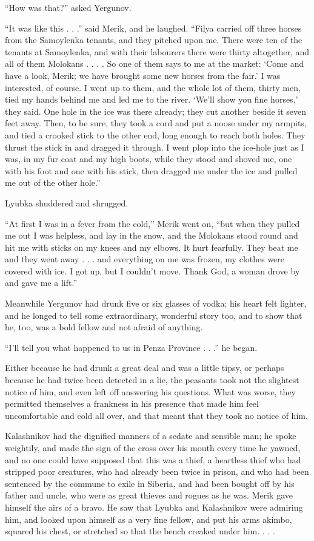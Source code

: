 “How was that?” asked Yergunov.

“It was like this . . .” said Merik, and he laughed. “Filya carried off
three horses from the Samoylenka tenants, and they pitched upon me.
There were ten of the tenants at Samoylenka, and with their labourers
there were thirty altogether, and all of them Molokans . . . . So one of
them says to me at the market: ‘Come and have a look, Merik; we have
brought some new horses from the fair.’ I was interested, of course. I
went up to them, and the whole lot of them, thirty men, tied my hands
behind me and led me to the river. ‘We’ll show you fine horses,’ they
said. One hole in the ice was there already; they cut another beside it
seven feet away. Then, to be sure, they took a cord and put a noose
under my armpits, and tied a crooked stick to the other end, long enough
to reach both holes. They thrust the stick in and dragged it through. I
went plop into the ice-hole just as I was, in my fur coat and my high
boots, while they stood and shoved me, one with his foot and one with
his stick, then dragged me under the ice and pulled me out of the other
hole.”

Lyubka shuddered and shrugged.

“At first I was in a fever from the cold,” Merik went on, “but when they
pulled me out I was helpless, and lay in the snow, and the Molokans
stood round and hit me with sticks on my knees and my elbows. It hurt
fearfully. They beat me and they went away . . . and everything on me
was frozen, my clothes were covered with ice. I got up, but I couldn’t
move. Thank God, a woman drove by and gave me a lift.”

Meanwhile Yergunov had drunk five or six glasses of vodka; his heart
felt lighter, and he longed to tell some extraordinary, wonderful story
too, and to show that he, too, was a bold fellow and not afraid of
anything.

“I’ll tell you what happened to us in Penza Province . . .” he began.

Either because he had drunk a great deal and was a little tipsy, or
perhaps because he had twice been detected in a lie, the peasants took
not the slightest notice of him, and even left off answering his
questions. What was worse, they permitted themselves a frankness in his
presence that made him feel uncomfortable and cold all over, and that
meant that they took no notice of him.

Kalashnikov had the dignified manners of a sedate and sensible man; he
spoke weightily, and made the sign of the cross over his mouth every
time he yawned, and no one could have supposed that this was a thief, a
heartless thief who had stripped poor creatures, who had already been
twice in prison, and who had been sentenced by the commune to exile in
Siberia, and had been bought off by his father and uncle, who were as
great thieves and rogues as he was. Merik gave himself the airs of a
bravo. He saw that Lyubka and Kalashnikov were admiring him, and looked
upon himself as a very fine fellow, and put his arms akimbo, squared his
chest, or stretched so that the bench creaked under him. . . .

